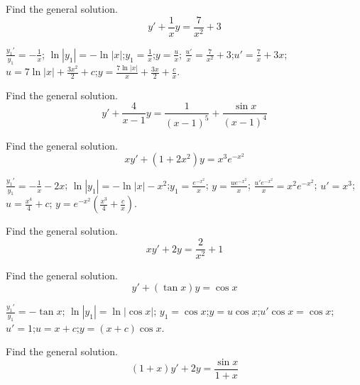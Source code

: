 \documentclass{ximera}
\begin{document}
\begin{problem}\label{exer:2.1.16} Find the general solution.
$$y'+\frac{1}{x}y=\frac{7}{x^2}+3$$



\begin{solution}
    $\frac{y_1'}{ y_1}=-\frac{1}{ x}$;\quad
$\ln|y_1|=-\ln|x|$;\quad $y_1=\frac{1}{ x}$;\quad $y=\frac{u}{
x}$;\quad
$\frac{u'}{ x}=\frac{7}{ x^2}+3$;\quad $u'=\frac{7}{
x}+3x$;\quad
$u=7\ln|x|+\frac{3x^2}{2}+c$;\quad $y=\frac{7\ln|x|}{
x}+\frac{3x}{2}+\frac{c}{ x}$.
\end{solution}
\end{problem}


\begin{problem}\label{exer:2.1.17} Find the general solution.
$$y'+\frac{4}{x-1}y= \frac{1}{(x-1)^5}+\frac{\sin x}{(x-1)^4}$$
\end{problem}

\begin{problem}\label{exer:2.1.18} Find the general solution.
$$xy'+(1+2x^2)y=x^3e^{-x^2}$$



\begin{solution}
    $\frac{y_1'}{ y_1}=-\frac{1}{ x}-2x$; \quad
$\ln|y_1|=-\ln|x|-x^2$;\quad $y_1=\frac{e^{-x^2}}{ x}$;\quad
$y=\frac{ue^{-x^2}}{ x}$;\quad
$\frac{u'e^{-x^2}}{ x}=x^2e^{-x^2}$;\quad
 $u'=x^3$;\quad
$u=\frac{x^4}{4}+c$;\quad
$y=e^{-x^2}{\left(\frac{x^3}{4}+\frac{c}{ x}\right)}$.
\end{solution}
\end{problem}

\begin{problem}\label{exer:2.1.19} Find the general solution.
$$xy'+2y=\frac{2}{x^2}+1$$
\end{problem}

\begin{problem}\label{exer:2.1.20} Find the general solution.
$$y'+(\tan x)y=\cos x$$



\begin{solution}
    $\frac{y_1'}{ y_1}=-\tan x$;\quad
$\ln|y_1|=\ln|\cos x|$;\quad
$y_1=\cos x$;\quad $y=u\cos x$;\quad $u'\cos x=\cos x$;\quad
$u'=1$;\quad $u=x+c$;\quad $y=(x+c)\cos x$.
\end{solution}
\end{problem}

\begin{problem}\label{exer:2.1.21} Find the general solution.
$$(1+x)y'+2y=\frac{\sin x}{1 + x}$$
\end{problem}
\end{document}
